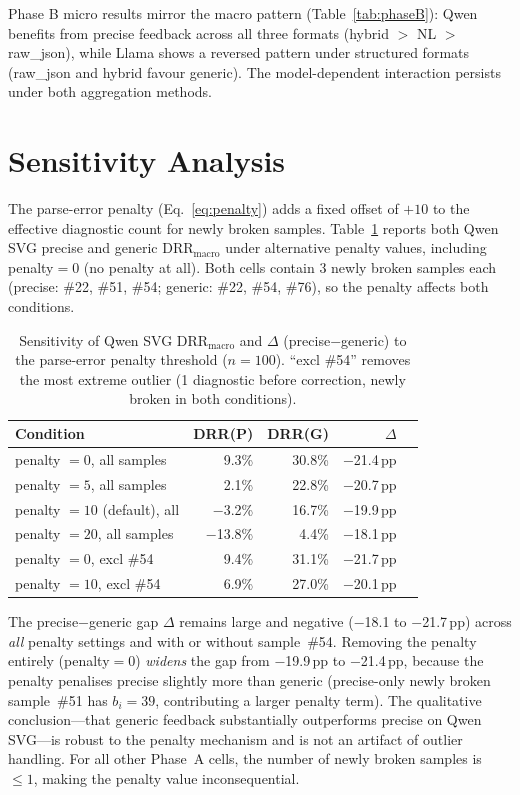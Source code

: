 Phase B micro results mirror the macro pattern (Table~\ref{tab:phaseB}): Qwen benefits from precise feedback across all three formats (hybrid $>$ NL $>$ raw\_json), while Llama shows a reversed pattern under structured formats (raw\_json and hybrid favour generic). The model-dependent interaction persists under both aggregation methods.

\section{Sensitivity Analysis}
\label{app:sensitivity}

The parse-error penalty (Eq.~\ref{eq:penalty}) adds a fixed offset of $+10$ to the effective diagnostic count for newly broken samples. Table~\ref{tab:sensitivity} reports both Qwen SVG precise and generic DRR$_\text{macro}$ under alternative penalty values, including penalty${}=0$ (no penalty at all). Both cells contain 3 newly broken samples each (precise: \#22, \#51, \#54; generic: \#22, \#54, \#76), so the penalty affects both conditions.

\begin{table}[h]
\centering
\small
\caption{Sensitivity of Qwen SVG DRR$_\text{macro}$ and $\Delta$ (precise$-$generic) to the parse-error penalty threshold ($n = 100$). ``excl \#54'' removes the most extreme outlier (1 diagnostic before correction, newly broken in both conditions).}
\label{tab:sensitivity}
\setlength{\tabcolsep}{5pt}
\begin{tabular}{lrrrr}
\toprule
Condition & DRR(P) & DRR(G) & $\Delta$ \\
\midrule
penalty $= 0$, all samples & 9.3\% & 30.8\% & $-$21.4\,pp \\
penalty $= 5$, all samples & 2.1\% & 22.8\% & $-$20.7\,pp \\
penalty $= 10$ (default), all & $-$3.2\% & 16.7\% & $-$19.9\,pp \\
penalty $= 20$, all samples & $-$13.8\% & 4.4\% & $-$18.1\,pp \\
\midrule
penalty $= 0$, excl \#54 & 9.4\% & 31.1\% & $-$21.7\,pp \\
penalty $= 10$, excl \#54 & 6.9\% & 27.0\% & $-$20.1\,pp \\
\bottomrule
\end{tabular}
\end{table}

The precise$-$generic gap $\Delta$ remains large and negative ($-$18.1 to $-$21.7\,pp) across \emph{all} penalty settings and with or without sample~\#54. Removing the penalty entirely (penalty${}=0$) \emph{widens} the gap from $-$19.9\,pp to $-$21.4\,pp, because the penalty penalises precise slightly more than generic (precise-only newly broken sample~\#51 has $b_i = 39$, contributing a larger penalty term). The qualitative conclusion---that generic feedback substantially outperforms precise on Qwen SVG---is robust to the penalty mechanism and is not an artifact of outlier handling. For all other Phase~A cells, the number of newly broken samples is $\leq 1$, making the penalty value inconsequential.

